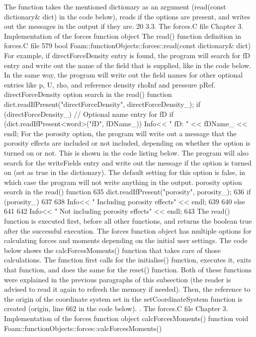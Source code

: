 The function takes the mentioned dictionary as an argument (read(const dictionary\& dict) in
the code below), reads if the options are present, and writes out the messages in the output if they
are.
20
3.3. The forces.C file Chapter 3. Implementation of the forces function object
The read() function definition in forces.C file
579 bool Foam::functionObjects::forces::read(const dictionary\& dict)
For example, if directForceDensity entry is found, the program will search for fD entry and write out the name of the field that is supplied, like in the code below. In the same way, the program will write out the field names for other optional entries like p, U, rho, and reference density rhoInf and pressure pRef.
directForceDensity option search in the read() function
dict.readIfPresent("directForceDensity", directForceDensity\_);
if (directForceDensity\_)
{
// Optional name entry for fD
if (dict.readIfPresent<word>("fD", fDName\_))
{
Info<< " fD: " << fDName\_ << endl;
}
}
For the porosity option, the program will write out a message that the porosity effects are included or not included, depending on whether the option is turned on or not. This is shown in the code listing below. The program will also search for the writeFields entry and write out the message if the option is turned on (set as true in the dictionary). The default setting for this option
is false, in which case the program will not write anything in the output.
porosity option search in the read() function
635 dict.readIfPresent("porosity", porosity\_);
636 if (porosity\_)
637 {
638 Info<< " Including porosity effects" << endl;
639 }
640 else
641 {
642 Info<< " Not including porosity effects" << endl;
643 }
The read() function is executed first, before all other functions, and returns the boolean true
after the successful execution.
The forces function object has multiple options for calculating forces and moments depending on
the initial user settings. The code below shows the calcForcesMoments() function that takes care
of those calculations. The function first calls for the initialise() function, executes it, exits that
function, and does the same for the reset() function. Both of these functions were explained in the
previous paragraphs of this subsection (the reader is advised to read it again to refresh the memory if
needed). Then, the reference to the origin of the coordinate system set in the setCoordinateSystem
function is created (origin, line 662 in the code below).
. The forces.C file Chapter 3. Implementation of the forces function object
 calcForcesMoments() function
 void Foam::functionObjects::forces::calcForcesMoments()
